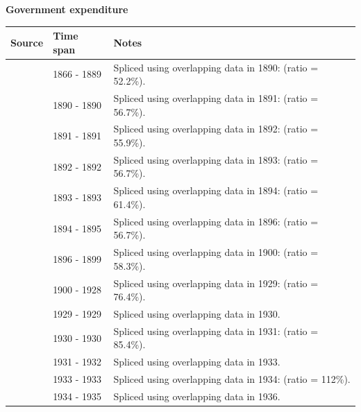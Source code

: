 \documentclass[12pt,a4paper,landscape]{article}
\begin{document}
\begin{adjustbox}{max totalsize={\paperwidth}{\paperheight},center}
\begin{minipage}[t][\textheight][t]{\textwidth}
\vspace*{0.5cm}
{}
\begin{center}
{\Large\bfseries Government expenditure}
\end{center}
\vspace{0.5cm}
\begin{table}[H]
\centering
\small
\begin{tabular}{|l|l|l|}
\hline
\textbf{Source} & \textbf{Time span} & \textbf{Notes} \\
\hline
\rowcolor{white}\cite{Mitchell}& 1866 - 1889 &Spliced using overlapping data in 1890: (ratio = 52.2\%). \\
\rowcolor{lightgray}\cite{HFS}& 1890 - 1890 &Spliced using overlapping data in 1891: (ratio = 56.7\%). \\
\rowcolor{white}\cite{Mitchell}& 1891 - 1891 &Spliced using overlapping data in 1892: (ratio = 55.9\%). \\
\rowcolor{lightgray}\cite{HFS}& 1892 - 1892 &Spliced using overlapping data in 1893: (ratio = 56.7\%). \\
\rowcolor{white}\cite{Mitchell}& 1893 - 1893 &Spliced using overlapping data in 1894: (ratio = 61.4\%). \\
\rowcolor{lightgray}\cite{HFS}& 1894 - 1895 &Spliced using overlapping data in 1896: (ratio = 56.7\%). \\
\rowcolor{white}\cite{Mitchell}& 1896 - 1899 &Spliced using overlapping data in 1900: (ratio = 58.3\%). \\
\rowcolor{lightgray}\cite{GMD_estimated}& 1900 - 1928 &Spliced using overlapping data in 1929: (ratio = 76.4\%). \\
\rowcolor{white}\cite{Mitchell}& 1929 - 1929 &Spliced using overlapping data in 1930. \\
\rowcolor{lightgray}\cite{GMD_estimated}& 1930 - 1930 &Spliced using overlapping data in 1931: (ratio = 85.4\%). \\
\rowcolor{white}\cite{Mitchell}& 1931 - 1932 &Spliced using overlapping data in 1933. \\
\rowcolor{lightgray}\cite{GMD_estimated}& 1933 - 1933 &Spliced using overlapping data in 1934: (ratio = 112\%). \\
\rowcolor{white}\cite{Mitchell}& 1934 - 1935 &Spliced using overlapping data in 1936. \\

\end{tabular}
\end{table}
\end{minipage}
\end{adjustbox}
\end{document}
